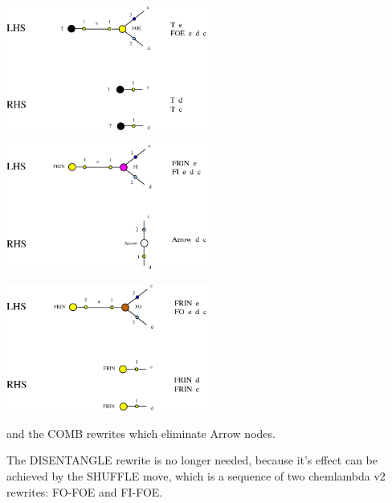 \documentclass{article}
\begin{document}
\centerline{\includegraphics[width=0.5\textwidth]{../img/termin2-T-FOE.jpg}
}
\vspace{.5cm}



\vspace{.5cm}
 
\centerline{\includegraphics[width=0.5\textwidth]{../img/termFI-FRIN-FI.jpg}
}
\vspace{.5cm}

\centerline{\includegraphics[width=0.5\textwidth]{../img/terminfrin-FRIN-FO.jpg}
}
\vspace{.5cm}

and the COMB rewrites which eliminate Arrow nodes. 



The DISENTANGLE rewrite is no longer needed, because it's effect can be achieved by the SHUFFLE move, which is a sequence of two chemlambda v2 rewrites: FO-FOE and FI-FOE.



\vspace{.5cm}
 
\end{document}
